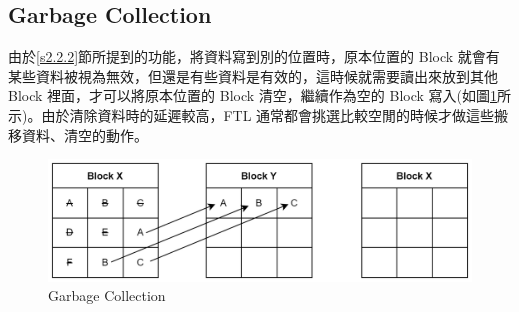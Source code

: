 \subsection{Garbage Collection}\label{s2.2.3}
\indent
由於\ref{s2.2.2}節所提到的功能，將資料寫到別的位置時，原本位置的 Block 就會有某些資料被視為無效，但還是有些資料是有效的，這時候就需要讀出來放到其他 Block 裡面，才可以將原本位置的 Block 清空，繼續作為空的 Block 寫入(如圖\ref{f2.7}所示)。由於清除資料時的延遲較高，FTL 通常都會挑選比較空閒的時候才做這些搬移資料、清空的動作。
\begin{figure}[H]
    \centering
    \includegraphics[width=1\textwidth]{picture/ch2/garbage_collection.png}
    \caption{Garbage Collection\cite{Garbage_Collection}}
    \label{f2.7}
\end{figure}

